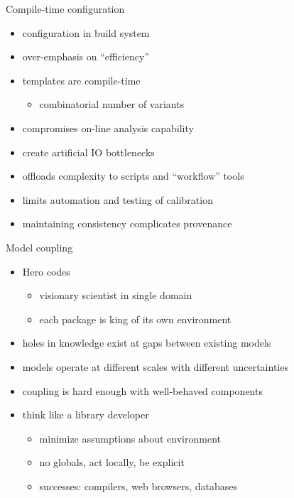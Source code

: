 \documentclass{beamer}
\begin{document}
\begin{frame}{Compile-time configuration}
  \begin{itemize}
  \item configuration in build system
  \item over-emphasis on ``efficiency''
  \item templates are compile-time
    \begin{itemize}
    \item combinatorial number of variants
    \end{itemize}
  \item compromises on-line analysis capability
  \item create artificial IO bottlenecks
  \item offloads complexity to scripts and ``workflow'' tools
  \item limits automation and testing of calibration
  \item maintaining consistency complicates provenance
  \end{itemize}
\end{frame}

\begin{frame}{Model coupling}
  \begin{itemize}
  \item Hero codes
    \begin{itemize}
    \item visionary scientist in single domain
    \item each package is king of its own environment
    \end{itemize}
  \item holes in knowledge exist at gaps between existing models
  \item models operate at different scales with different uncertainties
  \item coupling is hard enough with well-behaved components
  \item think like a library developer
    \begin{itemize}
    \item minimize assumptions about environment
    \item no globals, act locally, be explicit
    \item successes: compilers, web browsers, databases
    \end{itemize}
  \end{itemize}
\end{frame}
\end{document}
